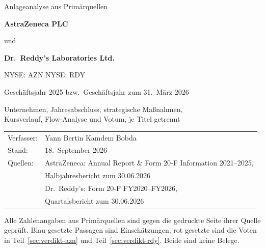 \begin{titlepage}
\centering
{}
{\large Anlageanalyse aus Prim\"arquellen\par}
\vspace{1.2cm}
{\Huge\bfseries AstraZeneca PLC\par}
\vspace{0.3cm}
{\LARGE und\par}
\vspace{0.3cm}
{\Huge\bfseries Dr.~Reddy's Laboratories Ltd.\par}
\vspace{0.6cm}
{\LARGE NYSE: AZN \quad\textbar\quad NYSE: RDY\par}
\vspace{0.4cm}
{\Large Gesch\"aftsjahr 2025 bzw.\ Gesch\"aftsjahr zum 31.~M\"arz 2026\par}
{\large Unternehmen, Jahresabschluss, strategische Ma{\ss}nahmen,\\
Kursverlauf, Flow-Analyse und Votum, je Titel getrennt\par}
\begin{tabular}{ll}
Verfasser: & Yann Bertin Kamdem Bobda\\
Stand:     & 18.~September 2026\\
Quellen:   & AstraZeneca: Annual Report \& Form 20-F Information 2021--2025,\\
           & Halbjahresbericht zum 30.06.2026\\
           & Dr.~Reddy's: Form 20-F FY2020--FY2026,\\
           & Quartalsbericht zum 30.06.2026\\
\end{tabular}
\par
\vspace{1.2cm}
\begin{minipage}{0.8\linewidth}
\centering\small
Alle Zahlenangaben aus Prim\"arquellen sind gegen die gedruckte Seite ihrer
Quelle gepr\"uft. Blau gesetzte Passagen sind Einsch\"atzungen, rot gesetzte
sind die Voten in Teil~\ref{sec:verdikt-azn} und Teil~\ref{sec:verdikt-rdy}.
Beide sind keine Belege.
\end{minipage}
\end{titlepage}
